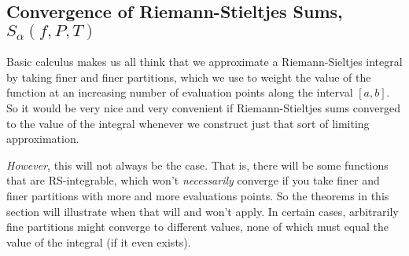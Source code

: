 \documentclass[12pt]{article}
\theoremstyle{plain}
\theoremstyle{definition}
\theoremstyle{remark}
\begin{document}
\newpage
\subsection{Convergence of Riemann-Stieltjes Sums, $S_\alpha(f,P,T)$}

Basic calculus makes us all think that we approximate a Riemann-Sieltjes integral by taking finer and finer partitions, which we use to weight the value of the function at an increasing number of evaluation points along the interval $[a,b]$.  So it would be very nice and very convenient if Riemann-Stieltjes sums converged to the value of the integral whenever we construct just that sort of limiting approximation. 

\emph{However}, this will not always be the case.  That is, there will be some functions that are RS-integrable, which won't \emph{necessarily} converge if you take finer and finer partitions with more and more evaluations points. So the theorems in this section will illustrate when that will and won't apply. In certain cases, arbitrarily fine partitions might converge to different values, none of which must equal the value of the integral (if it even exists).
\end{document}
